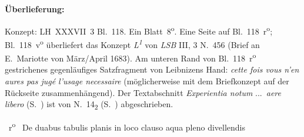 %
%
%
%
%
\frenchspacing%
%
\begin{ledgroupsized}[r]{120mm}
\footnotesize
\pstart
\noindent\textbf{Überlieferung:}
\pend
\end{ledgroupsized}
\begin{ledgroupsized}[r]{114mm}
\footnotesize
\pstart \parindent -6mm
%
Konzept: LH~XXXVII~3 Bl.~118.
Ein Blatt~8\textsuperscript{o}.
Eine Seite auf Bl.~118~r\textsuperscript{o};
Bl.~118~v\textsuperscript{o} 
überliefert das Konzept \textit{L\textsuperscript{1}} von \textit{LSB} III, 3 N.~456\cite{01262} (Brief an E.~Mariotte von März/April 1683).
Am unteren Rand von Bl.~118~r\textsuperscript{o} gestrichenes gegenläufiges Satzfragment von Leibnizens Hand:
\textit{cette fois vous n'en aures pas jugé l'usage necessaire}
(möglicherweise mit dem Briefkonzept auf der Rückseite zusammenhängend).
Der Textabschnitt \textit{Experientia notum} \lbrack...\rbrack\ \textit{aere libero} (S.~) ist von N.~14\textsubscript{2} (S.~) abgeschrieben.
\pend
\end{ledgroupsized}
%
%
%
\frenchspacing%
%
%
\count{}
\count{}
\count{}
\vspace{8mm}
\pstart%
\normalsize%
\noindent%
%
~r\textsuperscript{o}\rbrack\ %
%
\pend%
\pstart%
\centering%
De duabus tabulis planis in loco clauso aqua pleno divellendis
\pend%
\vspace*{0.5em}%
%
\pstart%
\noindent%
%
